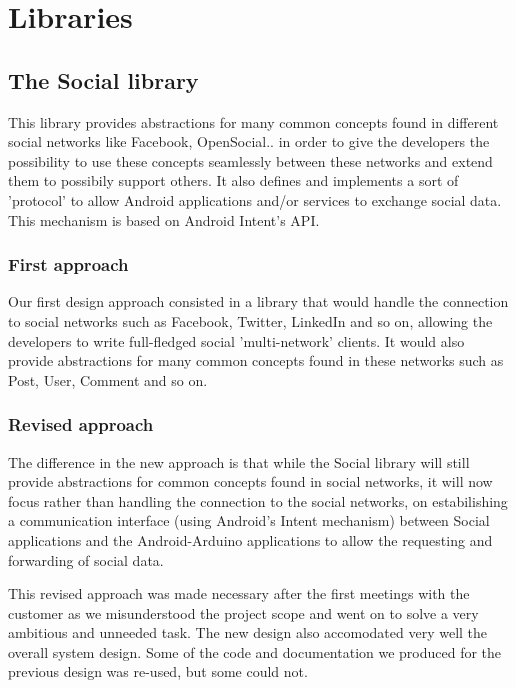 \newpage

\section{Libraries}

\subsection{The Social library}
This library provides abstractions for many common concepts found in different
social networks like Facebook, OpenSocial.. in order to give the developers the possibility
to use these concepts seamlessly between these networks and extend them to possibily support others.
It also defines and implements a sort of 'protocol' to allow Android applications and/or services
to exchange social data. This mechanism is based on Android Intent's API.

\subsubsection{First approach}
Our first design approach consisted in a library that would handle the connection to social networks
such as Facebook, Twitter, LinkedIn and so on, allowing the developers to write full-fledged
social 'multi-network' clients. It would also provide abstractions for many common concepts
found in these networks such as Post, User, Comment and so on.

\subsubsection{Revised approach}
The difference in the new approach is that while the Social library will still provide
abstractions for common concepts found in social networks, it will now focus rather than handling
the connection to the social networks, on estabilishing a communication interface (using Android's Intent mechanism)
between Social applications and the Android-Arduino applications to allow the requesting and forwarding of social data.

This revised approach was made necessary after the first meetings with the customer
as we misunderstood the project scope and went on to solve a very ambitious and unneeded task.
The new design also accomodated very well the overall system design. Some of the code and documentation we produced
for the previous design was re-used, but some could not.


